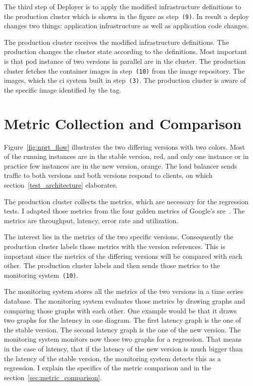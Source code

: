 The third step of Deployer is to apply the modified infrastructure definitions to the
production cluster which is shown in the figure as step~\texttt{(9)}. In result a deploy
changes two things: application infrastructure as well as application code changes.

The production cluster receives the modified infrastructure definitions. The production
changes the cluster state according to the definitions. Most important is that pod
instance of two versions in parallel are in the cluster. The production cluster fetches
the container images in step~\texttt{(10)} from the image repository. The images, which
the \gls{ci} system built in step~\texttt{(3)}. The production cluster is aware of the
specific image identified by the tag.

\section{Metric Collection and Comparison}

Figure~\ref{fig:nprt_flow} illustrates the two differing versions with two colors. Most of
the running instances are in the stable version, red, and only one instance or in practice
few instances are in the new version, orange. The load balancer sends traffic to both
versions and both versions respond to clients, on which section~\ref{test_architecture}
elaborates.

The production cluster collects the metrics, which are necessary for the regression tests.
I adapted those metrics from the four golden metrics of Google's
\gls{sre}~\cite{sre_monitoring}. The metrics are throughput, latency, error rate and
utilization.

The interest lies in the metrics of the two specific versions. Consequently the production
cluster labels those metrics with the version references. This is important since the
metrics of the differing versions will be compared with each other. The production cluster
labels and then sends those metrics to the monitoring system~\texttt{(10)}.

The monitoring system stores all the metrics of the two versions in a time series
database. The monitoring system evaluates those metrics by drawing graphs and comparing
those graphs with each other. One example would be that it draws two graphs for the
latency in one diagram. The first latency graph is the one of the stable version. The
second latency graph is the one of the new version. The monitoring system monitors now
those two graphs for a regression. That means in the case of latency, that if the latency
of the new version is much bigger than the latency of the stable version, the monitoring
system detects this as a regression. I explain the specifics of the metric comparison and
in the section~\ref{sec:metric_comparison}.

